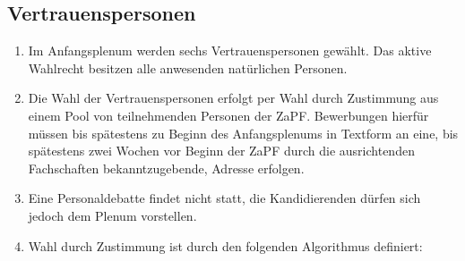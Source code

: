 \documentclass[
  ngerman,
  a4paper,
  oneside]{scrartcl}
\providecommand{\tightlist}{%
  \setlength{\itemsep}{0pt}\setlength{\parskip}{0pt}}
\begin{document}
\subsection{Vertrauenspersonen}\label{vertrauenspersonen}

\begin{enumerate}
\def\labelenumi{\arabic{enumi}.}
\tightlist
\item
  Im Anfangsplenum werden sechs Vertrauenspersonen gewählt. Das aktive
  Wahlrecht besitzen alle anwesenden natürlichen Personen.
\item
  Die Wahl der Vertrauenspersonen erfolgt per Wahl durch Zustimmung aus
  einem Pool von teilnehmenden Personen der ZaPF. Bewerbungen hierfür
  müssen bis spätestens zu Beginn des Anfangsplenums in Textform an
  eine, bis spätestens zwei Wochen vor Beginn der ZaPF durch die
  ausrichtenden Fachschaften bekanntzugebende, Adresse erfolgen.
\item
  Eine Personaldebatte findet nicht statt, die Kandidierenden dürfen
  sich jedoch dem Plenum vorstellen.
\item
  Wahl durch Zustimmung ist durch den folgenden Algorithmus definiert:


\end{enumerate}
\end{document}
